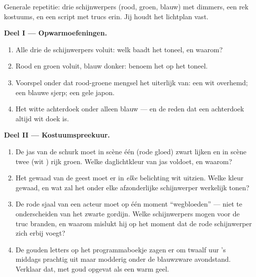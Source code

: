 \begin{problem}\label{pb:g8:colors-spectra:1}
Generale repetitie: drie schijnwerpers (rood, groen, blauw) met
dimmers, een rek kostuums, en een script met trucs erin. Jij houdt het
lichtplan vast.

\medskip\noindent\textbf{Deel I --- Opwarmoefeningen.}
\begin{enumerate}
  \item Alle drie de schijnwerpers voluit: welk  baadt het
        toneel, en waarom?
  \item Rood en groen voluit, blauw donker: benoem het
         op het toneel.
  \item Voorspel onder dat rood-groene mengsel het uiterlijk van: een
        wit overhemd; een blauwe sjerp; een gele japon.
  \item Het witte achterdoek onder alleen blauw --- en de reden dat
        een achterdoek altijd wit doek is.
\end{enumerate}

\medskip\noindent\textbf{Deel II --- Kostuumspreekuur.}
\begin{enumerate}[resume]
  \item De jas van de schurk moet in scène één (rode gloed) zwart
        lijken en in scène twee (wit ) rijk groen. Welke
        daglichtkleur van jas voldoet, en waarom?
  \item Het gewaad van de geest moet er in \emph{elke} belichting wit
        uitzien. Welke kleur gewaad, en wat zal het onder elke
        afzonderlijke schijnwerper werkelijk tonen?
  \item De rode sjaal van een acteur moet op één moment
        ``wegbloeden'' --- niet te onderscheiden van het zwarte
        gordijn. Welke schijnwerpers mogen voor de truc branden, en
        waarom mislukt hij op het moment dat de rode schijnwerper zich
        erbij voegt?
  \item De gouden letters op het programmaboekje zagen er om twaalf
        uur 's middags prachtig uit maar modderig onder de blauwzware
        avondstand. Verklaar dat, met goud opgevat als een warm geel.
\end{enumerate}


\end{problem}
